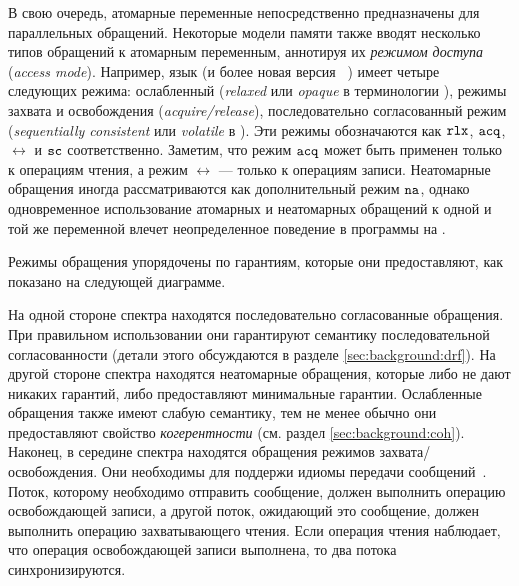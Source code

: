 В свою очередь, атомарные переменные непосредственно 
предназначены для параллельных обращений. 
Некоторые модели памяти также вводят 
несколько типов обращений к атомарным переменным,  аннотируя их 
 \emph{режимом доступа} (\emph{access mode}).
Например, язык \CPP (и более новая версия \Java~\cite{Bender-Palsberg:OOPSLA19})
имеет четыре следующих режима: ослабленный (\emph{relaxed}
или \emph{opaque} в терминологии \Java),
режимы захвата и освобождения (\emph{acquire/release}), 
последовательно согласованный режим (\emph{sequentially consistent}
или  \emph{volatile} в \Java). 
Эти режимы обозначаются как $\mathtt{rlx}$, ${\mathtt{acq}}$, $\rel$ и ${\mathtt{sc}}$ соответственно.
Заметим, что режим ${\mathtt{acq}}$ может быть применен только к операциям чтения,
а режим $\rel$ --- только к операциям записи.
Неатомарные обращения иногда рассматриваются как дополнительный режим $\mathtt{na}$, 
однако  одновременное использование атомарных 
и неатомарных обращений к одной и той же переменной 
влечет неопределенное поведение в программы на \CPP.

Режимы обращения упорядочены по гарантиям, 
которые они предоставляют, как показано на следующей диаграмме. 




На одной стороне  спектра находятся последовательно согласованные обращения.
При правильном использовании они гарантируют семантику 
последовательной согласованности
(детали этого обсуждаются в разделе \cref{sec:background:drf}).
На другой стороне  спектра находятся неатомарные обращения, которые либо не дают никаких гарантий, 
либо предоставляют минимальные гарантии. 
Ослабленные обращения также имеют слабую семантику, 
тем не менее обычно они предоставляют свойство \emph{когерентности}
(см. раздел \cref{sec:background:coh}).
Наконец, в середине спектра находятся обращения режимов захвата/освобождения. 
Они необходимы для поддержи идиомы передачи сообщений~\cite{Lahav-al:POPL16}.
Поток, которому необходимо отправить сообщение, должен выполнить операцию освобождающей записи, 
а другой поток, ожидающий это сообщение, должен выполнить операцию захватывающего чтения. 
Если операция чтения наблюдает, что  операция освобождающей записи выполнена, то два потока синхронизируются.

